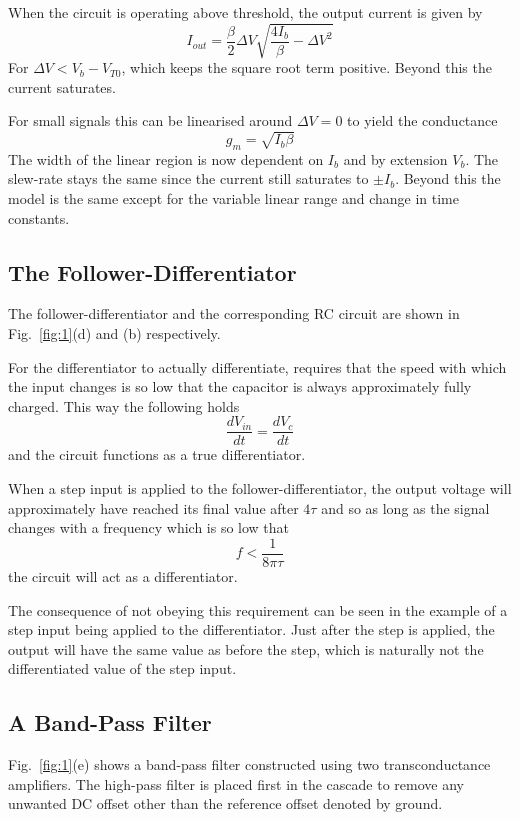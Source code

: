 When the circuit is operating above threshold, the output current is given by 
\begin{equation*}
    I_{out} = \frac{\beta}{2}\Delta V\sqrt{\frac{4I_b}{\beta}-\Delta V^2}
\end{equation*}
For \(\Delta V < V_b-V_{T0}\), which keeps the square root term positive. Beyond this the current saturates.

For small signals this can be linearised around \(\Delta V = 0\) to yield the conductance
\begin{equation*}
    g_m = \sqrt{I_b\beta}
\end{equation*}
The width of the linear region is now dependent on \(I_b\) and by extension \(V_b\). The slew-rate stays the same since the current
still saturates to \(\pm I_b\). Beyond this the model is the same except for the variable linear range and change in time constants.

\subsection{The Follower-Differentiator}
The follower-differentiator and the corresponding RC circuit are shown in Fig.~\ref{fig:1}(d) and (b) respectively.

For the differentiator to actually differentiate, requires that the speed with which the input changes is so low that the capacitor is
always approximately fully charged. This way the following holds
\begin{equation*}
    \frac{dV_{in}}{dt} = \frac{dV_c}{dt}
\end{equation*}
and the circuit functions as a true differentiator.

When a step input is applied to the follower-differentiator, the output voltage will approximately have reached its final value after \(4\tau\)
and so as long as the signal changes with a frequency which is so low that
\begin{equation*}
    f < \frac{1}{8\pi\tau}
\end{equation*}
the circuit will act as a differentiator.

The consequence of not obeying this requirement can be seen in the example of a step input being applied to the differentiator. Just after the step is
applied, the output will have the same value as before the step, which is naturally not the differentiated value of the step input.

\subsection{A Band-Pass Filter}
Fig.~\ref{fig:1}(e) shows a band-pass filter constructed using two transconductance amplifiers. The high-pass filter is placed first in the 
cascade to remove any unwanted DC offset other than the reference offset denoted by ground.

